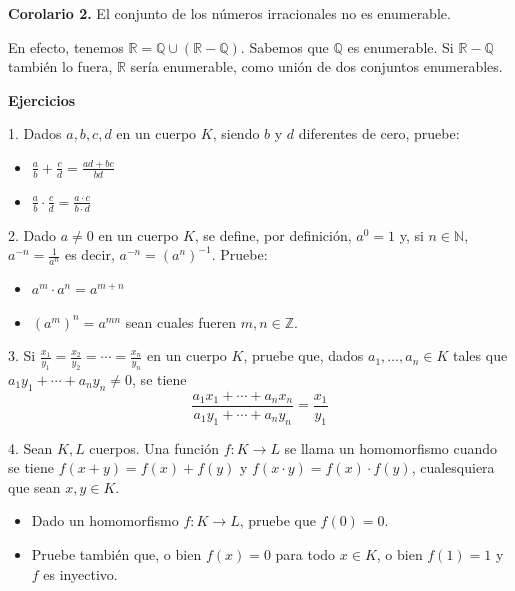 \documentclass[12pt,oneside]{book}
\begin{document}
\textbf{Corolario 2.} El conjunto de los números irracionales no es enumerable.

En efecto, tenemos \( \mathbb{R} = \mathbb{Q} \cup (\mathbb{R} - \mathbb{Q}) \). Sabemos que \( \mathbb{Q} \) es enumerable. Si \( \mathbb{R} - \mathbb{Q} \) también lo fuera, \( \mathbb{R} \) sería enumerable, como unión de dos conjuntos enumerables.

\textbf{Ejercicios}

1. Dados \( a, b, c, d \) en un cuerpo \( K \), siendo \( b \) y \( d \) diferentes de cero, pruebe:

\begin{itemize}
    \item[$1^{\text{a}}$)] \( \frac{a}{b} + \frac{c}{d} = \frac{ad + bc}{bd} \)
    \item[$2^\text{a}$)] \( \frac{a}{b} \cdot \frac{c}{d} = \frac{a \cdot c}{b \cdot d} \)
\end{itemize}

2. Dado \( a \neq 0 \) en un cuerpo \( K \), se define, por definición, \( a^0 = 1 \) y, si \( n \in \mathbb{N} \), \( a^{-n} = \frac{1}{a^n} \) es decir, \( a^{-n} = (a^n)^{-1} \). Pruebe:

\begin{itemize}
    \item[$1^{\text{a}}$)] \( a^m \cdot a^n = a^{m+n} \)
    \item[$2^\text{a}$)] \( (a^m)^n = a^{mn} \) sean cuales fueren \( m, n \in \mathbb{Z} \).
\end{itemize}

3. Si \( \frac{x_1}{y_1} = \frac{x_2}{y_2} = \cdots = \frac{x_n}{y_n} \) en un cuerpo \( K \), pruebe que, dados \( a_1, \ldots, a_n \in K \) tales que \( a_1y_1 + \cdots + a_ny_n \neq 0 \), se tiene \[ \frac{a_1x_1 + \cdots + a_nx_n}{a_1y_1 + \cdots + a_ny_n} = \frac{x_1}{y_1} \]

4. Sean \( K, L \) cuerpos. Una función \( f: K \to L \) se llama un homomorfismo cuando se tiene \( f(x + y) = f(x) + f(y) \) y \( f(x \cdot y) = f(x) \cdot f(y) \), cualesquiera que sean \( x, y \in K \).

\begin{itemize}
    \item [i)] Dado un homomorfismo \( f: K \to L \), pruebe que \( f(0) = 0 \).
    \item  [ii)] Pruebe también que, o bien \( f(x) = 0 \) para todo \( x \in K \), o bien \( f(1) = 1 \) y \( f \) es inyectivo.
\end{itemize}
\end{document}
